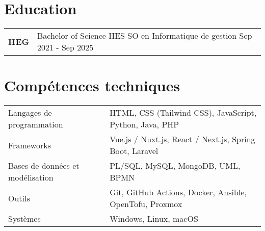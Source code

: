 \documentclass[a4paper,11pt]{article}
\begin{document}
\section{Education}
\begin{tabularx}{\linewidth}{@{}l X@{}}	
\textbf{HEG} & Bachelor of Science HES-SO en Informatique de gestion \hfill \normalsize Sep 2021 - Sep 2025\\

\end{tabularx}


\section{Compétences techniques}
\begin{tabularx}{\linewidth}{@{}l X@{}}
Langages de programmation & HTML, CSS (Tailwind CSS), JavaScript, Python, Java, PHP \\
Frameworks & Vue.js / Nuxt.js, React / Next.js, Spring Boot, Laravel \\
Bases de données et modélisation & PL/SQL, MySQL, MongoDB, UML, BPMN \\
Outils & Git, GitHub Actions, Docker, Ansible, OpenTofu, Proxmox \\
Systèmes & Windows, Linux, macOS \\
\end{tabularx}



\end{document}
